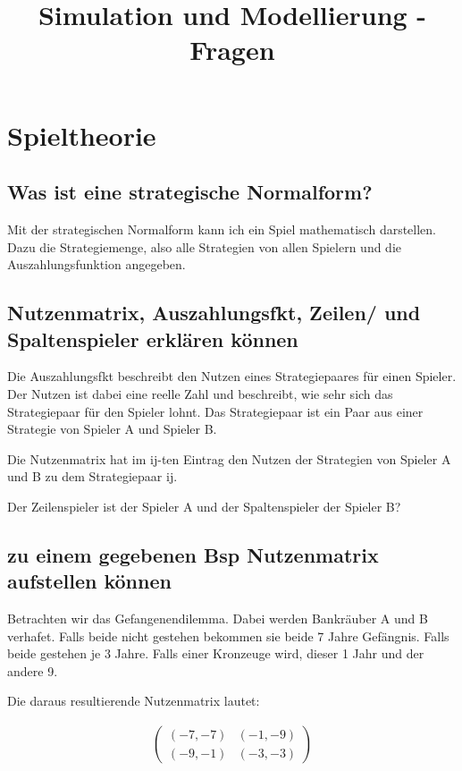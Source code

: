 \documentclass[]{article}
\title{Simulation und Modellierung - Fragen}
\author{}
\begin{document}
\maketitle

\section{Spieltheorie}

\subsection*{Was ist eine strategische Normalform? }
Mit der strategischen Normalform kann ich ein Spiel mathematisch darstellen. Dazu die Strategiemenge, also alle Strategien von allen Spielern und die Auszahlungsfunktion angegeben.  

\subsection*{Nutzenmatrix, Auszahlungsfkt, Zeilen/ und Spaltenspieler erklären können}

Die Auszahlungsfkt beschreibt den Nutzen eines Strategiepaares für einen Spieler. Der Nutzen ist dabei eine reelle Zahl und beschreibt, wie sehr sich das Strategiepaar für den Spieler lohnt. Das Strategiepaar ist ein Paar aus einer Strategie von Spieler A und Spieler B.  

Die Nutzenmatrix hat im ij-ten Eintrag den Nutzen der Strategien von Spieler A und B zu dem Strategiepaar ij. 

Der Zeilenspieler ist der Spieler A und der Spaltenspieler der Spieler B? 


\subsection*{zu einem gegebenen Bsp Nutzenmatrix aufstellen können}
Betrachten wir das Gefangenendilemma. Dabei werden Bankräuber A und B verhafet. Falls beide nicht gestehen bekommen sie beide 7 Jahre Gefängnis. Falls beide gestehen je 3 Jahre. Falls einer Kronzeuge wird, dieser 1 Jahr und der andere 9.

Die daraus resultierende Nutzenmatrix lautet:

\begin{align*}
	\begin{pmatrix}
		(-7,-7) & (-1,-9) \\
		(-9,-1) & (-3,-3)
	\end{pmatrix}
\end{align*}
\end{document}
